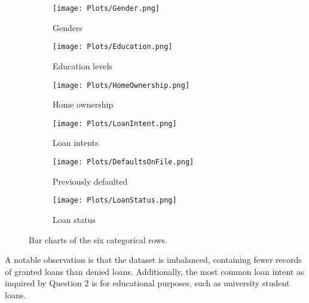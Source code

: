 \begin{figure}[H]
    \centering
    \begin{subfigure}[b]{0.3\textwidth}
        \centering
        \texttt{[image: Plots/Gender.png]}
        \caption{Genders}
        \label{fig:Bar1}
    \end{subfigure}
    \hfill
    \begin{subfigure}[b]{0.3\textwidth}
        \centering
        \texttt{[image: Plots/Education.png]}
        \caption{Education levels}
        \label{fig:Bar2}
    \end{subfigure}
    \hfill
    \begin{subfigure}[b]{0.3\textwidth}
        \centering
        \texttt{[image: Plots/HomeOwnership.png]}
        \caption{Home ownership}
        \label{fig:Bar3}
    \end{subfigure}
    
    \vspace{1em}
    
    \begin{subfigure}[b]{0.3\textwidth}
        \centering
        \texttt{[image: Plots/LoanIntent.png]}
        \caption{Loan intents}
        \label{fig:Bar4}
    \end{subfigure}
    \hfill
    \begin{subfigure}[b]{0.3\textwidth}
        \centering
        \texttt{[image: Plots/DefaultsOnFile.png]}
        \caption{Previously defaulted}
        \label{fig:Bar5}
    \end{subfigure}
    \hfill
    \begin{subfigure}[b]{0.3\textwidth}
        \centering
        \texttt{[image: Plots/LoanStatus.png]}
        \caption{Loan status}
        \label{fig:Bar6}
    \end{subfigure}
    \caption{Bar charts of the six categorical rows.}
    \label{fig:BarCharts}
\end{figure}

\para A notable observation is that the dataset is imbalanced, containing fewer records of granted 
loans than denied loans. Additionally, the most common loan intent as inquired by Question 2 is for 
educational purposes, such as university student loans.

